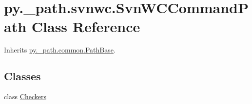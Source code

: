 \hypertarget{classpy_1_1__path_1_1svnwc_1_1_svn_w_c_command_path}{}\section{py.\+\_\+path.\+svnwc.\+Svn\+W\+C\+Command\+Path Class Reference}
\label{classpy_1_1__path_1_1svnwc_1_1_svn_w_c_command_path}


Inherits \hyperlink{classpy_1_1__path_1_1common_1_1_path_base}{py.\+\_\+path.\+common.\+Path\+Base}.

\subsection*{Classes}
\begin{DoxyCompactItemize}
\item 
class \hyperlink{classpy_1_1__path_1_1svnwc_1_1_svn_w_c_command_path_1_1_checkers}{Checkers}
\end{DoxyCompactItemize}
